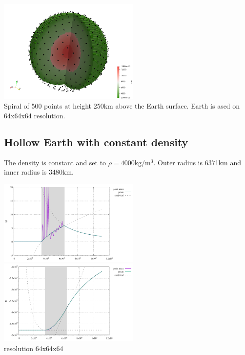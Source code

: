 \begin{center}
\includegraphics[width=7cm]{python_codes/fieldstone_84/earth/spiral.png}\\
{\captionfont Spiral of 500 points at height 250km above the Earth surface. 
Earth is ased on 64x64x64 resolution.}
\end{center}


\subsection*{Hollow Earth with constant density}

The density is constant and set to $\rho=4000\si{\kg\per\cubic\metre}$. Outer radius is 6371km and inner
radius is 3480km.


\begin{center}
\includegraphics[width=7cm]{python_codes/fieldstone_84/hollow_earth/gravnorm}
\includegraphics[width=7cm]{python_codes/fieldstone_84/hollow_earth/gravpot}\\
{\captionfont resolution 64x64x64}
\end{center}










